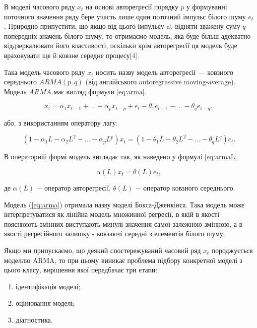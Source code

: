 В моделі часового ряду $x_{t}$ на основі авторегресії порядку $p$ у формуванні поточного значення ряду бере участь лише один поточний імпульс білого шуму $e_{t}$. Природно припустити, що якщо від цього імпульсу at відняти зважену суму $q$ попередніх значень білого шуму, то отримаємо модель, яка буде більш адекватно віддзеркалювати його властивості, оскільки крім авторегресії ця модель буде враховувати ще й ковзне середнє процесу[4].

Така модель часового ряду $x_{t}$ носить назву модель авторегресії — ковзного середнього $ARMA(p,q)$ (від англійського autoregressive moving-average). Модель $ARMA$ має вигляд формули \ref{eq:arma}.

\begin{equation}\label{eq:arma}
x_{t} = \alpha_{1}x_{t-1} + \dots + \alpha_{p}x_{t-p} + e_{t} - \theta_{1}e_{t-1} - \dots - \theta_{q}e_{t-q},
\end{equation}

\noindent або, з використанням оператору лагу:

\[
(1 - \alpha_{1}L - \alpha_{2}L^{2} - \dots - \alpha_{p}L^{p})x_{t} = (1 - \theta_{1}L - \theta_{2}L^{2} - \dots - \theta_{q}L^{q})e_{t}.
\]

В операторній формі модель виглядає так, як наведено у формулі \ref{eq:armaL}.

\begin{equation}\label{eq:armaL}
\alpha(L)x_{t} = \theta(L)e_{t},
\end{equation}

\noindent де $\alpha(L)$ $-$ оператор авторегресії, $\theta(L)$ $-$ оператор ковзного середнього.

Модель (\ref{eq:arma}) отримала назву моделі Бокса-Дженкінса. Така модель може інтерпретуватися як лінійна модель множинної регресії, в якій в якості пояснюють змінних виступають минулі значення самої залежною змінною, а в якості регресійного залишку - ковзаючі середні з елементів білого шуму.

Якщо ми припускаємо, що деякий спостережуваний часовий ряд $x_{t}$ породжується моделлю ARMA, то при цьому виникає проблема підбору конкретної моделі з цього класу, вирішення якої передбачає три етапи:

\begin{enumerate}
	\item ідентифікація моделі;
	\item оцінювання моделі;
	\item діагностика.
\end{enumerate}

